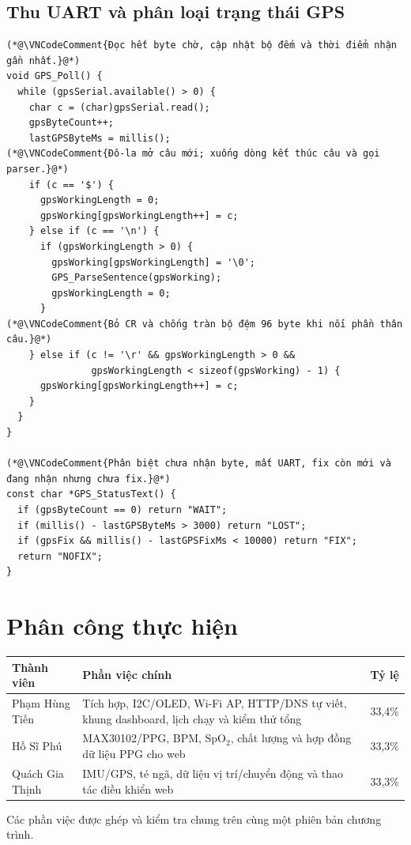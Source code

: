 \documentclass[12pt]{article}
\begin{document}
\subsection{Thu UART và phân loại trạng thái GPS}
\begin{lstlisting}[style=firmware,caption={Gom dòng NMEA và trả WAIT/LOST/NOFIX/FIX}]
(*@\VNCodeComment{Đọc hết byte chờ, cập nhật bộ đếm và thời điểm nhận gần nhất.}@*)
void GPS_Poll() {
  while (gpsSerial.available() > 0) {
    char c = (char)gpsSerial.read();
    gpsByteCount++;
    lastGPSByteMs = millis();
(*@\VNCodeComment{Đô-la mở câu mới; xuống dòng kết thúc câu và gọi parser.}@*)
    if (c == '$') {
      gpsWorkingLength = 0;
      gpsWorking[gpsWorkingLength++] = c;
    } else if (c == '\n') {
      if (gpsWorkingLength > 0) {
        gpsWorking[gpsWorkingLength] = '\0';
        GPS_ParseSentence(gpsWorking);
        gpsWorkingLength = 0;
      }
(*@\VNCodeComment{Bỏ CR và chống tràn bộ đệm 96 byte khi nối phần thân câu.}@*)
    } else if (c != '\r' && gpsWorkingLength > 0 &&
               gpsWorkingLength < sizeof(gpsWorking) - 1) {
      gpsWorking[gpsWorkingLength++] = c;
    }
  }
}

(*@\VNCodeComment{Phân biệt chưa nhận byte, mất UART, fix còn mới và đang nhận nhưng chưa fix.}@*)
const char *GPS_StatusText() {
  if (gpsByteCount == 0) return "WAIT";
  if (millis() - lastGPSByteMs > 3000) return "LOST";
  if (gpsFix && millis() - lastGPSFixMs < 10000) return "FIX";
  return "NOFIX";
}
\end{lstlisting}

\section{Phân công thực hiện}

\begin{tabularx}{\textwidth}{L{3.4cm} Y C{2cm}}
\toprule
\textbf{Thành viên} & \textbf{Phần việc chính} & \textbf{Tỷ lệ}\\
\midrule
Phạm Hùng Tiến & Tích hợp, I2C/OLED, Wi-Fi AP, HTTP/DNS tự viết, khung dashboard, lịch chạy và kiểm thử tổng & 33,4\%\\
Hồ Sĩ Phú & MAX30102/PPG, BPM, SpO$_2$, chất lượng và hợp đồng dữ liệu PPG cho web & 33,3\%\\
Quách Gia Thịnh & IMU/GPS, té ngã, dữ liệu vị trí/chuyển động và thao tác điều khiển web & 33,3\%\\
\bottomrule
\end{tabularx}

Các phần việc được ghép và kiểm tra chung trên cùng một phiên bản chương trình.
\end{document}
